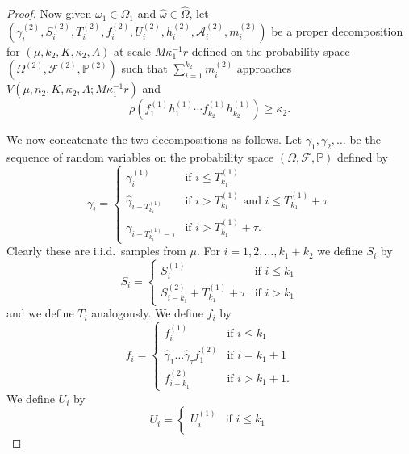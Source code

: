 \documentclass[10pt, english,oneside,reqno]{amsart}
\theoremstyle{plain}
\theoremstyle{remark}
\numberwithin{equation}{section}
\numberwithin{figure}{section}
\begin{document}
\begin{proof}
    Now given $\omega_1 \in \Omega_1$ and $\hat{\omega} \in \hat{\Omega}$, let $\left(\gamma_i^{(2)}, S_i^{(2)}, T_i^{(2)}, f_i^{(2)}, U_i^{(2)}, h_i^{(2)}, \mathscr{A}_i^{(2)}, m_i^{(2)}\right)$ be a proper decomposition for $(\mu, k_2, K, \kappa_2, A)$ at scale $M\kappa_1^{-1}r$ defined on the probability space $\left(\Omega^{(2)}, \mathscr{F}^{(2)}, \mathbb{P}^{(2)}\right)$ such that $\sum_{i = 1}^{k_2} m_i^{(2)}$ approaches $V(\mu,n_2,K,\kappa_2,A;M\kappa_1^{-1}r)$ and  $$\rho(f_1^{(1)}h_1^{(1)}\cdots f_{k_2}^{(1)}h_{k_2}^{(1)}) \geq \kappa_2.$$ 

    We now concatenate the two decompositions as follows. Let $\gamma_1, \gamma_2, \dots$ be the sequence of random variables on the probability space $\left(\Omega, \mathscr{F}, \mathbb{P}\right)$ defined by $$\gamma_i = \begin{cases}
        \gamma_i^{(1)} & \text{if } i \leq T^{(1)}_{k_1} \\
        \hat{\gamma}_{i - T^{(1)}_{k_1}} & \text{if } i > T^{(1)}_{k_1} \text{ and } i \leq T^{(1)}_{k_1} + \tau \\
        \gamma_{i - T^{(1)}_{k_1} - \tau} & \text{if } i > T^{(1)}_{k_1} + \tau.
    \end{cases}$$
    Clearly these are i.i.d.\ samples from $\mu$. For $i = 1, 2, \dots, k_1 + k_2$ we define $S_i$ by
    \begin{equation*}
        S_i =
        \begin{cases}
            S_i^{(1)} & \text{if } i \leq k_1\\
            S_{i-k_1}^{(2)} + T^{(1)}_{k_1} + \tau & \text{if } i > k_1
        \end{cases}
    \end{equation*}
    and we define $T_i$ analogously. We define $f_i$ by
    \begin{equation*}
        f_i =
        \begin{cases}
            f_i^{(1)} & \text{if } i \leq k_1\\
            \hat{\gamma}_1 \dots \hat{\gamma}_{\tau} f_{1}^{(2)} & \text{if } i = k_1 + 1 \\
            f_{i-k_1}^{(2)} & \text{if } i > k_1 + 1.
        \end{cases}
    \end{equation*}
    We define $U_i$ by
    \begin{equation*}
        U_i =
        \begin{cases}
            U_i^{(1)} & \text{if } i \leq k_1\\

\end{cases}
\end{equation*}
\end{proof}
\end{document}
